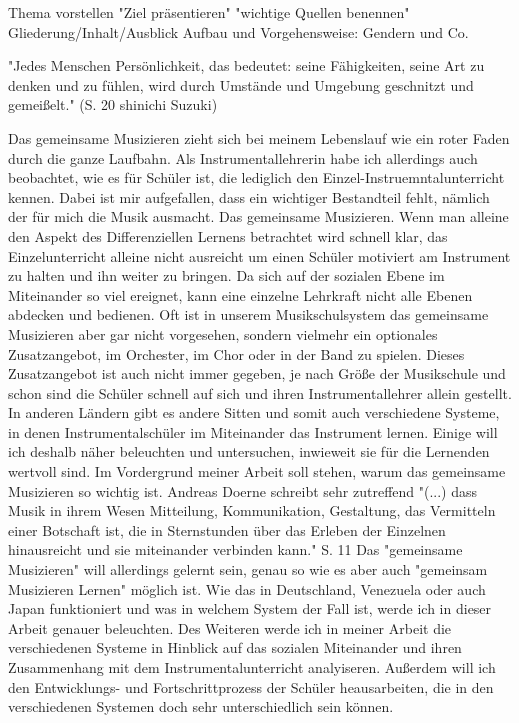

Thema vorstellen
"Ziel präsentieren"
"wichtige Quellen benennen"
Gliederung/Inhalt/Ausblick
Aufbau und Vorgehensweise: Gendern und Co. 


"Jedes Menschen Persönlichkeit, das bedeutet: seine Fähigkeiten, seine Art zu
denken und zu fühlen, wird durch Umstände und Umgebung geschnitzt und
gemeißelt." (S. 20 shinichi Suzuki)

Das gemeinsame Musizieren zieht sich bei meinem Lebenslauf wie ein roter Faden
durch die ganze Laufbahn. Als Instrumentallehrerin habe ich allerdings auch
beobachtet, wie es für Schüler ist, die lediglich den
Einzel-Instruemntalunterricht kennen. Dabei ist mir aufgefallen, dass ein
wichtiger Bestandteil fehlt, nämlich der für mich die Musik ausmacht. Das
gemeinsame Musizieren. Wenn man alleine den Aspekt des
Differenziellen Lernens betrachtet wird schnell klar, das Einzelunterricht
alleine nicht ausreicht um einen Schüler motiviert am Instrument zu halten und
ihn weiter zu bringen. Da sich auf der sozialen Ebene im Miteinander so viel
ereignet, kann eine einzelne Lehrkraft nicht alle Ebenen abdecken und bedienen.
Oft ist in unserem Musikschulsystem das gemeinsame Musizieren aber gar nicht
vorgesehen, sondern vielmehr ein optionales Zusatzangebot, im Orchester, im Chor
oder in der Band zu spielen. Dieses Zusatzangebot ist auch nicht immer gegeben,
je nach Größe der Musikschule und schon sind die Schüler schnell auf sich und
ihren Instrumentallehrer allein gestellt. In anderen Ländern gibt es andere
Sitten und somit auch verschiedene Systeme, in denen Instrumentalschüler im
Miteinander das Instrument lernen. Einige will ich deshalb näher beleuchten und
untersuchen, inwieweit sie für die Lernenden wertvoll sind. Im Vordergrund
meiner Arbeit soll stehen, warum das gemeinsame Musizieren so
wichtig ist.
Andreas Doerne schreibt sehr zutreffend "(...) dass Musik in ihrem Wesen Mitteilung, Kommunikation, Gestaltung, das
Vermitteln einer Botschaft ist, die in Sternstunden über das Erleben der
Einzelnen hinausreicht und sie miteinander verbinden kann." S. 11
Das "gemeinsame Musizieren" will allerdings gelernt sein, genau so wie es
aber auch "gemeinsam Musizieren Lernen" möglich ist. Wie das in Deutschland,
Venezuela oder auch Japan funktioniert und was in welchem System der Fall ist, werde ich in dieser Arbeit
genauer beleuchten. Des Weiteren werde ich in meiner Arbeit die verschiedenen
Systeme in Hinblick auf das sozialen Miteinander und ihren Zusammenhang mit
dem Instrumentalunterricht analyiseren. Außerdem will ich den Entwicklungs- und
Fortschrittprozess der Schüler heausarbeiten, die in den verschiedenen Systemen doch sehr unterschiedlich sein
können.

